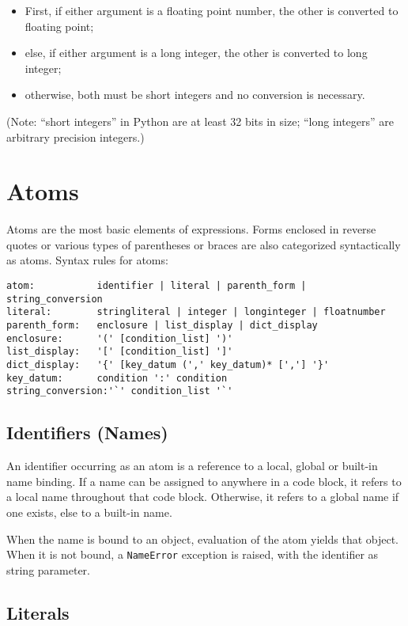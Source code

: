 \begin{itemize}
\item	First, if either argument is a floating point number,
	the other is converted to floating point;
\item	else, if either argument is a long integer,
	the other is converted to long integer;
\item	otherwise, both must be short integers and no conversion
	is necessary.
\end{itemize}

(Note: ``short integers'' in Python are at least 32 bits in size;
``long integers'' are arbitrary precision integers.)

\section{Atoms}

Atoms are the most basic elements of expressions.
Forms enclosed in reverse quotes or various types of parentheses
or braces are also categorized syntactically as atoms.
Syntax rules for atoms:

\begin{verbatim}
atom:           identifier | literal | parenth_form | string_conversion
literal:        stringliteral | integer | longinteger | floatnumber
parenth_form:   enclosure | list_display | dict_display
enclosure:      '(' [condition_list] ')'
list_display:   '[' [condition_list] ']'
dict_display:   '{' [key_datum (',' key_datum)* [','] '}'
key_datum:      condition ':' condition
string_conversion:'`' condition_list '`'
\end{verbatim}

\subsection{Identifiers (Names)}

An identifier occurring as an atom is a reference to a local, global
or built-in name binding.  If a name can be assigned to anywhere in a code
block, it refers to a local name throughout that code block.
Otherwise, it refers to a global name if one exists, else to a
built-in name.

When the name is bound to an object, evaluation of the atom
yields that object.
When it is not bound, a {\tt NameError} exception
is raised, with the identifier as string parameter.

\subsection{Literals}

